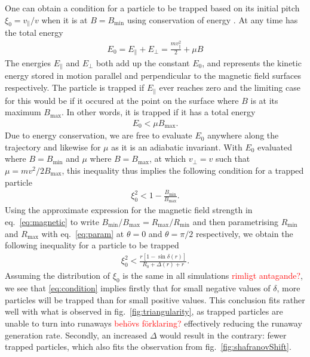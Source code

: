 \documentclass[11pt,a4paper]{article}
\begin{document}
One can obtain a condition for a particle to be trapped based on its initial pitch $\xi_0=v_\parallel/v$ when it is at $B=B_\text{min}$ using conservation of energy \cite{hoppeBSc}.
At any time has the total energy
\begin{align*}
    E_0
    =E_\parallel + E_\perp
    =\frac{mv_\parallel^2}{2}+\mu B
\end{align*}
The energies $E_\parallel$ and $E_\perp$ both add up the constant $E_0$, and represents the kinetic energy stored in motion parallel and perpendicular to the magnetic field surfaces respectively.
The particle is trapped if $E_\parallel$ ever reaches zero and the limiting case for this would be if it occured at the point on the surface where $B$ is at its maximum $B_\text{max}$.
In other words, it is trapped if it has a total energy
\begin{align*}
    E_0
    <\mu B_\text{max}.
\end{align*}
Due to energy conservation, we are free to evaluate $E_0$ anywhere along the trajectory and likewise for $\mu$ as it is an adiabatic invariant.
With $E_0$ evaluated where $B=B_\text{min}$ and $\mu$ where $B=B_\text{max}$, at which $v_\perp=v$ such that $\mu=mv^2/2B_\text{max}$, this inequality thus implies the following condition for a trapped particle
\begin{align*}
    \xi_0^2
    <1-\frac{B_\text{min}}{B_\text{max}}.
\end{align*}
Using the approximate expression for the magnetic field strength in eq.\ \eqref{eq:magnetic} to write $B_\text{min}/B_\text{max}=R_\text{max}/R_\text{min}$ and then parametrising $R_\text{min}$ and $R_\text{max}$ with eq.\ \eqref{eq:param} at $\theta=0$ and $\theta=\pi/2$ respectively, we obtain the following inequality for a particle to be trapped
\begin{align}
    \label{eq:condition}
    \xi_0^2
    <\frac{r[1-\sin\delta(r)]}{R_0+\Delta(r)+r}.
\end{align}
Assuming the distribution of $\xi_0$ is the same in all simulations \textcolor{red}{rimligt antagande?}, we see that \eqref{eq:condition} implies firstly that for small negative values of $\delta$, more particles will be trapped than for small positive values.
This conclusion fits rather well with what is observed in fig.\ \ref{fig:triangularity}, as trapped particles are unable to turn into runaways \textcolor{red}{behövs förklaring?} effectively reducing the runaway generation rate.
Secondly, an increased $\Delta$ would result in the contrary: fewer trapped particles, which also fits the observation from fig.\ \ref{fig:shafranovShift}.
\end{document}
